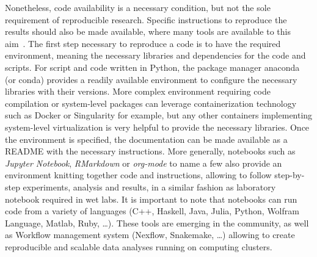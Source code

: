 Nonetheless, code availability is a necessary condition, but not the sole requirement of reproducible research.
Specific instructions to reproduce the results should also be made available, where many tools are available to this aim~\citep{Wilson2014,Darriba2018}.
The first step necessary to reproduce a code is to have the required environment, meaning the necessary libraries and dependencies for the code and scripts.
For script and code written in Python, the package manager anaconda (or conda) provides a readily available environment to configure the necessary libraries with their versions.
More complex environment requiring code compilation or system-level packages can leverage containerization technology such as Docker or Singularity for example, but any other containers implementing system-level virtualization is very helpful to provide the necessary libraries.
Once the environment is specified, the documentation can be made available as a README with the necessary instructions.
More generally, notebooks such as \textit{Jupyter Notebook}, \textit{RMarkdown} or \textit{org-mode} to name a few also provide an environment knitting together code and instructions, allowing to follow step-by-step experiments, analysis and results, in a similar fashion as laboratory notebook required in wet labs.
It is important to note that notebooks can run code from a variety of languages (C++, Haskell, Java, Julia, Python, Wolfram Language, Matlab, Ruby, \ldots).
These tools are emerging in the community, as well as Workflow management system (Nexflow, Snakemake, \ldots) allowing to create reproducible and scalable data analyses running on computing clusters.

